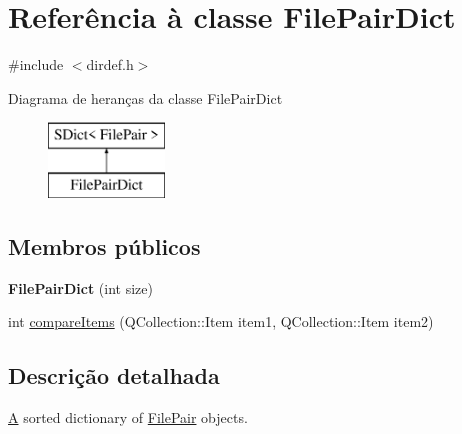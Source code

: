 \hypertarget{class_file_pair_dict}{\section{Referência à classe File\-Pair\-Dict}
\label{class_file_pair_dict}
}


{\ttfamily \#include $<$dirdef.\-h$>$}

Diagrama de heranças da classe File\-Pair\-Dict\begin{figure}[H]
\begin{center}
\leavevmode
\includegraphics[height=2.000000cm]{class_file_pair_dict}
\end{center}
\end{figure}
\subsection*{Membros públicos}
\begin{DoxyCompactItemize}
\item 
\hypertarget{class_file_pair_dict_a4cd1686d88dff8446eb5d3fec0e4d9e5}{{\bfseries File\-Pair\-Dict} (int size)}\label{class_file_pair_dict_a4cd1686d88dff8446eb5d3fec0e4d9e5}

\item 
int \hyperlink{class_file_pair_dict_a219450accf048597ffc7113ecde4c402}{compare\-Items} (Q\-Collection\-::\-Item item1, Q\-Collection\-::\-Item item2)
\end{DoxyCompactItemize}


\subsection{Descrição detalhada}
\hyperlink{class_a}{A} sorted dictionary of \hyperlink{class_file_pair}{File\-Pair} objects. 

